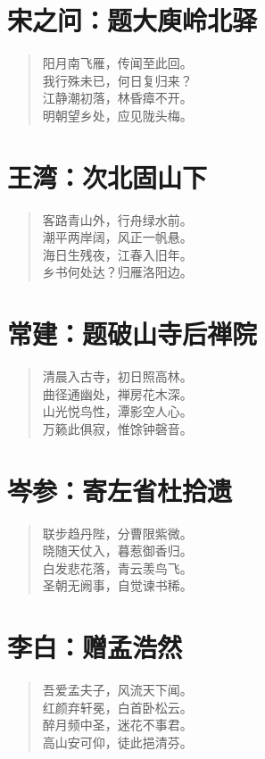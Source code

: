 \documentclass[12pt,oneside]{book}
\newenvironment{shici}{
\begin{verse}
\centering\large\hspace{12pt}}
{\end{verse}}
\begin{document}
\chapter{宋之问：题大庾岭北驿}
\begin{shici}
阳月南飞雁，传闻至此回。\\
我行殊未已，何日复归来？\\
江静潮初落，林昏瘴不开。\\
明朝望乡处，应见陇头梅。
\end{shici}

\chapter{王湾：次北固山下}
\begin{shici}
客路青山外，行舟绿水前。\\
潮平两岸阔，风正一帆悬。\\
海日生残夜，江春入旧年。\\
乡书何处达？归雁洛阳边。
\end{shici}

\chapter{常建：题破山寺后禅院}
\begin{shici}
清晨入古寺，初日照高林。\\
曲径通幽处，禅房花木深。\\
山光悦鸟性，潭影空人心。\\
万籁此俱寂，惟馀钟磬音。
\end{shici}

\chapter{岑参：寄左省杜拾遗}
\begin{shici}
联步趋丹陛，分曹限紫微。\\
晓随天仗入，暮惹御香归。\\
白发悲花落，青云羡鸟飞。\\
圣朝无阙事，自觉谏书稀。
\end{shici}

\chapter{李白：赠孟浩然}
\begin{shici}
吾爱孟夫子，风流天下闻。\\
红颜弃轩冕，白首卧松云。\\
醉月频中圣，迷花不事君。\\
高山安可仰，徒此挹清芬。
\end{shici}
\end{document}
